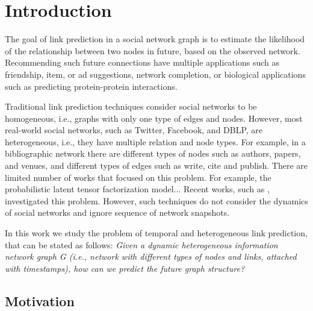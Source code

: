 \section{Introduction}
\label{Sec:Introduction}


The goal of link prediction in a social network graph \cite{liben2007link} is to estimate the likelihood of the relationship between two nodes in future, based on the observed network. Recommending such future connections have multiple applications such as friendship, item, or ad suggestions, network completion, or biological applications such as predicting protein-protein interactions.


Traditional link prediction techniques  consider social networks to be homogeneous, i.e., graphs with only one type of edges and nodes. However, most real-world social networks, such as Twitter, Facebook, and DBLP, are heterogeneous, i.e., they have multiple relation and node types. For example, in a bibliographic network there are different types of nodes such as authors, papers, and venues, and different types of edges such as write, cite and publish. There are limited number of works that focused on this problem. For example, the probabilistic latent tensor factorization model... Recent works, such as \cite{sun2011pathsim}, investigated this problem. However, such techniques do not consider the dynamics of social networks and ignore sequence of network snapshots. 
\cite{Zhu2016} \cite{sun2011pathsim} \cite{Sun:2012:HRP:2124295.2124373}  \cite{huang2016meta} \cite{wang2016relsim} \cite{sun2013pathselclus} \cite{sun2011ASONAM} \cite{Yang2012} \cite{liben2007link}


In this work we study the problem of temporal and heterogeneous link prediction, that can be stated as follows: \textit{Given a dynamic heterogeneous information network graph G (i.e., network with different types of nodes and links, attached with timestamps), how can we predict the future graph structure?}



\subsection{Motivation}

